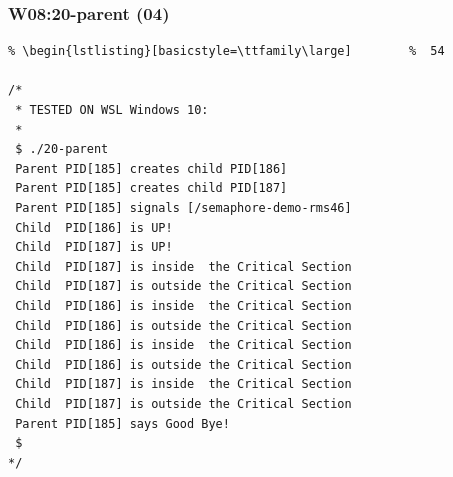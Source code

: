 \documentclass[xcolor=table, notheorems, hyperref={pdfpagelabels=false}]{beamer}
\begin{document}
\begin{frame}[fragile]
\frametitle{W08:20-parent (04)}
\begin{lstlisting}[basicstyle=\ttfamily\footnotesize] %  72
% \begin{lstlisting}[basicstyle=\ttfamily\small]        %  65
% \begin{lstlisting}[basicstyle=\ttfamily\large]        %  54

/*
 * TESTED ON WSL Windows 10:
 *
 $ ./20-parent 
 Parent PID[185] creates child PID[186]
 Parent PID[185] creates child PID[187]
 Parent PID[185] signals [/semaphore-demo-rms46]
 Child  PID[186] is UP!
 Child  PID[187] is UP!
 Child  PID[187] is inside  the Critical Section
 Child  PID[187] is outside the Critical Section
 Child  PID[186] is inside  the Critical Section
 Child  PID[186] is outside the Critical Section
 Child  PID[186] is inside  the Critical Section
 Child  PID[186] is outside the Critical Section
 Child  PID[187] is inside  the Critical Section
 Child  PID[187] is outside the Critical Section
 Parent PID[185] says Good Bye!
 $
*/

\end{lstlisting}
\end{frame}

\end{document}
